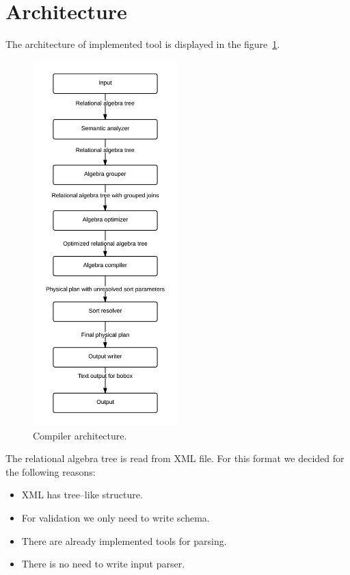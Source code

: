 \section{Architecture}
The architecture of implemented tool is displayed in the figure~\ref{fig:compilerarchitecture}.

\begin{figure}[h!]
  \centering
    \includegraphics[width=0.5\textwidth]{compilerarchitecture}

      \caption{Compiler architecture.}
          \label{fig:compilerarchitecture}
\end{figure}

The relational algebra tree is read from XML file. For this format we decided for the following reasons:
\begin{itemize}
\item XML has tree--like structure.
\item For validation we only need to write schema.
\item There are already implemented tools for parsing.
\item There is no need to write input parser.
\end{itemize}

